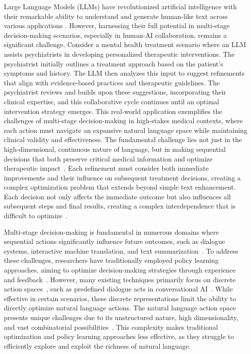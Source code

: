 \documentclass{article}
\begin{document}
Large Language Models (LLMs) have revolutionized artificial intelligence with their remarkable ability to understand and generate human-like text across various applications \cite{brown2020language,achiam2023gpt}. However, harnessing their full potential in multi-stage decision-making scenarios, especially in human-AI collaboration, remains a significant challenge. Consider a mental health treatment scenario where an LLM assists psychiatrists in developing personalized therapeutic interventions. The psychiatrist initially outlines a treatment approach based on the patient's symptoms and history. The LLM then analyzes this input to suggest refinements that align with evidence-based practices and therapeutic guidelines. The psychiatrist reviews and builds upon these suggestions, incorporating their clinical expertise, and this collaborative cycle continues until an optimal intervention strategy emerges. This real-world application exemplifies the challenges of multi-stage decision-making in high-stakes medical contexts, where each action must navigate an expansive natural language space while maintaining clinical validity and effectiveness. The fundamental challenge lies not just in the high-dimensional, continuous nature of language, but in making sequential decisions that both preserve critical medical information and optimize therapeutic impact~\cite{he2015deep,jaques2019way}. Each refinement must consider both immediate improvements and their influence on subsequent treatment decisions, creating a complex optimization problem that extends beyond simple text enhancement. Each decision not only affects the immediate outcome but also influences all subsequent steps and final results, creating a complex interdependence that is difficult to optimize~\cite{sutton1998reinforcement,silver2014deterministic}. 


Multi-stage decision-making is fundamental in numerous domains where sequential actions significantly influence future outcomes, such as dialogue systems, interactive machine translation, and text summarization~\cite{wen2016network,peng2017composite,zhang2019budgeted,dong2018banditsum,gu2021memsum,lam2019interactive,huang2021transmart}. To address these challenges, researchers have traditionally employed policy learning approaches, aiming to optimize decision-making strategies through experience and feedback~\cite{sutton1998reinforcement,silver2014deterministic}. However, many existing techniques primarily focus on discrete action spaces~\cite{mnih2015human,lillicrap2015continuous}, such as predefined dialogue acts in conversational AI~\cite{kwan2023survey,chen2017survey}. While effective in certain scenarios, these discrete representations limit the ability to directly optimize natural language actions. The natural language action space presents unique challenges due to its unstructured nature, high dimensionality, and vast combinatorial possibilities~\cite{he2015deep,jaques2019way}. This complexity makes traditional optimization and policy learning approaches less effective, as they struggle to efficiently explore and exploit the richness of natural language.
\end{document}

